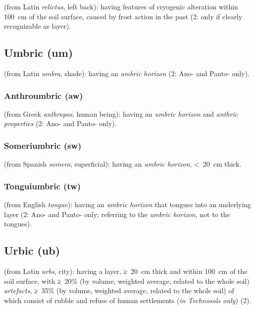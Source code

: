 \documentclass[
  letterpaper,
  DIV=11,
  numbers=noendperiod]{scrreprt}
\begin{document}
(from Latin \emph{relictus}, left back): having features of cryogenic
alteration within 100~cm of the soil surface, caused by frost action in
the past (2: only if clearly recognizable as layer).

\hypertarget{umbric-um}{%
\subsection{Umbric (um)}\label{umbric-um}}

(from Latin \emph{umbra}, shade): having an \emph{umbric horizon} (2:
Ano- and Panto- only).

\hypertarget{anthroumbric-aw}{%
\subsubsection{Anthroumbric (aw)}\label{anthroumbric-aw}}

(from Greek \emph{anthropos}, human being): having an \emph{umbric
horizon} and \emph{anthric properties} (2: Ano- and Panto- only).

\hypertarget{someriumbric-sw}{%
\subsubsection{Someriumbric (sw)}\label{someriumbric-sw}}

(from Spanish \emph{somero}, superficial): having an \emph{umbric
horizon}, \textless~20~cm thick.

\hypertarget{tonguiumbric-tw}{%
\subsubsection{Tonguiumbric (tw)}\label{tonguiumbric-tw}}

(from English \emph{tongue}): having an \emph{umbric horizon} that
tongues into an underlying layer (2: Ano- and Panto- only; referring to
the \emph{umbric horizon}, not to the tongues).

\hypertarget{urbic-ub}{%
\subsection{Urbic (ub)}\label{urbic-ub}}

(from Latin \emph{urbs}, city): having a layer, ≥~20~cm thick and within
100~cm of the soil surface, with ≥~20\% (by volume, weighted average,
related to the whole soil) \emph{artefacts}, ≥~35\% (by volume, weighted
average, related to the whole soil) of which consist of rubble and
refuse of human settlements (\emph{in Technosols only}) (2).
\end{document}
